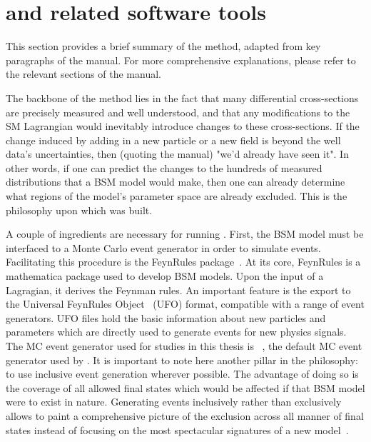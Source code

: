 \section{\contur and related software tools}
\label{sec:reinterpretsoftware}
This section provides a brief summary of the \contur method, adapted from key paragraphs of the manual. For more comprehensive explanations, please refer to the relevant sections of the manual.

The backbone of the \contur method lies in the fact that many differential cross-sections are precisely measured and well understood, and that any modifications to the SM Lagrangian would inevitably introduce changes to these cross-sections. If the change induced by adding in a new particle or a new field is beyond the well data's uncertainties, then (quoting the manual) "we'd already have seen it". In other words, if one can predict the changes to the hundreds of \LHC measured distributions that a BSM model would make, then one can already determine what regions of the model's parameter space are already excluded. This is the philosophy upon which \contur was built. 

A couple of ingredients are necessary for running \contur. First, the BSM model must be interfaced to a Monte Carlo event generator in order to simulate events. Facilitating this procedure is the FeynRules package~\cite{Alloul:2013bka}. At its core, FeynRules is a mathematica package used to develop BSM models. Upon the input of a Lagragian, it derives the Feynman rules. An important feature is the export to the Universal FeynRules Object~\cite{Degrande:2011ua} (UFO) format, compatible with a range of event generators. UFO files hold the basic information about new particles and parameters which are directly used to generate events for new physics signals. The MC event generator used for studies in this thesis is \herwig~\cite{Bahr:2008pv}, the default MC event generator used by \contur. It is important to note here another pillar in the \contur philosophy: to use inclusive event generation wherever possible. The advantage of doing so is the coverage of all allowed final states which would be affected if that BSM model were to exist in nature. Generating events inclusively rather than exclusively allows \contur to paint a comprehensive picture of the exclusion across all manner of final states instead of focusing on the most spectacular signatures of a new model~\cite{conturmanual}. 

